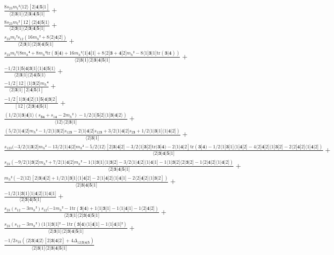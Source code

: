 \documentclass[varwidth, border=5pt]{standalone}
\newcommand{\tr}{\text{tr}}
\begin{document}
\begin{my}
$\begin{gathered}
\scriptscriptstyle\frac{8s_{23}m_t²⟨12⟩[2|𝟒|𝟓|1]}{⟨2|𝟑|1]⟨2|𝟑|𝟒|𝟓|1]} +\\
\scriptscriptstyle\frac{8s_{23}m_t²[12]⟨2|𝟒|𝟓|1⟩}{⟨2|𝟑|1]⟨2|𝟑|𝟒|𝟓|1]} +\\
\scriptscriptstyle\frac{s_{23}m_t²s_{12}(16m_h²+8⟨2|𝟒|2])}{⟨2|𝟑|1]⟨2|𝟑|𝟒|𝟓|1]} +\\
\scriptscriptstyle\frac{s_{23}m_t²(8m_h⁴+8m_h²\tr(𝟑|𝟒)+16m_h²⟨1|𝟒|1]+8⟨2|𝟑+𝟒|2]m_h²-8⟨1|𝟑|1]\tr(𝟑|𝟒))}{⟨2|𝟑|1]⟨2|𝟑|𝟒|𝟓|1]} +\\
\scriptscriptstyle\frac{-1/2⟨1|𝟓|𝟒|𝟑|1]⟨1|𝟒|𝟓|1⟩}{⟨2|𝟑|1]⟨2|𝟒|𝟓|1⟩} +\\
\scriptscriptstyle\frac{-1/2[12]⟨1|𝟑|2]m_h⁴}{⟨2|𝟑|1][2|𝟒|𝟓|1]} +\\
\scriptscriptstyle\frac{-1/2[1|𝟑|𝟒|2]⟨1|𝟓|𝟒|𝟑|2]}{[12]⟨2|𝟑|𝟒|𝟓|1]} +\\
\scriptscriptstyle\frac{(1/2⟨1|𝟑|𝟒|1⟩(s_{𝟑𝟒}+s_{1𝟒}-2m_h²)-1/2⟨1|𝟓|2]⟨1|𝟑|𝟒|2⟩)}{⟨12⟩⟨2|𝟑|1]} +\\
\scriptscriptstyle\frac{(5/2⟨1|𝟒|2]m_h²-1/2⟨1|𝟑|2]s_{12𝟑}-2⟨1|𝟒|2]s_{12𝟑}+3/2⟨1|𝟒|2]s_{2𝟑}+1/2⟨1|𝟑|1]⟨1|𝟒|2])}{⟨2|𝟑|1]} +\\
\scriptscriptstyle\frac{s_{123}(-3/2⟨1|𝟑|2]m_h²-13/2⟨1|𝟒|2]m_h²-5/2⟨12⟩[2|𝟑|𝟒|2]-3/2⟨1|𝟑|2]\tr(𝟑|𝟒)-2⟨1|𝟒|2]\tr(𝟑|𝟒)-1/2⟨1|𝟑|1]⟨1|𝟒|2]-4⟨2|𝟒|2]⟨1|𝟑|2]-2⟨2|𝟒|2]⟨1|𝟒|2])}{⟨2|𝟑|𝟒|𝟓|1]} +\\
\scriptscriptstyle\frac{s_{23}(-9/2⟨1|𝟑|2]m_h²+7/2⟨1|𝟒|2]m_h²-1⟨1|𝟑|1]⟨1|𝟑|2]-3/2⟨1|𝟒|2]⟨1|𝟒|1]-1⟨1|𝟑|2]⟨2|𝟑|2]-1⟨2|𝟒|2]⟨1|𝟒|2])}{⟨2|𝟑|𝟒|𝟓|1]} +\\
\scriptscriptstyle\frac{m_h²(-2⟨12⟩[2|𝟑|𝟒|2]+1/2⟨1|𝟑|1]⟨1|𝟒|2]-2⟨1|𝟒|2]⟨1|𝟒|1]-2⟨2|𝟒|2]⟨1|𝟑|2])}{⟨2|𝟑|𝟒|𝟓|1]} +\\
\scriptscriptstyle\frac{-1/2⟨1|𝟑|1]⟨1|𝟒|2]⟨1|𝟒|1]}{⟨2|𝟑|𝟒|𝟓|1]} +\\
\scriptscriptstyle\frac{s_{23}(s_{12}-3m_h²)s_{12}(-1m_h²-1\tr(𝟑|𝟒)+1⟨1|𝟑|1]-1⟨1|𝟒|1]-1⟨2|𝟒|2])}{⟨2|𝟑|1]⟨2|𝟑|𝟒|𝟓|1]} +\\
\scriptscriptstyle\frac{s_{23}(s_{12}-3m_h²)(1⟨1|𝟑|1]²-1\tr(𝟑|𝟒)⟨1|𝟒|1]-1⟨1|𝟒|1]²)}{⟨2|𝟑|1]⟨2|𝟑|𝟒|𝟓|1]} +\\
\scriptscriptstyle\frac{-1/2s_{23}(⟨2|𝟑|𝟒|2⟩[2|𝟑|𝟒|2]+4Δ_{12|𝟑|𝟒|𝟓})}{⟨2|𝟑|1]⟨2|𝟑|𝟒|𝟓|1]} \phantom{+}
\end{gathered}$
\end{my}
\end{document}
